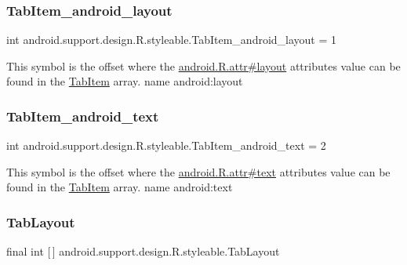 \subsubsection{\texorpdfstring{Tab\+Item\+\_\+android\+\_\+layout}{TabItem\_android\_layout}}
{\footnotesize\ttfamily int android.\+support.\+design.\+R.\+styleable.\+Tab\+Item\+\_\+android\+\_\+layout = 1\hspace{0.3cm}{\ttfamily [static]}}

This symbol is the offset where the \hyperlink{}{android.\+R.\+attr\#layout} attribute\textquotesingle{}s value can be found in the \hyperlink{classandroid_1_1support_1_1design_1_1R_1_1styleable_a244f187ed8d4ed589f36e6db741d19e8}{Tab\+Item} array.  name android\+:layout \mbox{\label{classandroid_1_1support_1_1design_1_1R_1_1styleable_acc3aa4481a2a0607245faab284197fcf}} 
\subsubsection{\texorpdfstring{Tab\+Item\+\_\+android\+\_\+text}{TabItem\_android\_text}}
{\footnotesize\ttfamily int android.\+support.\+design.\+R.\+styleable.\+Tab\+Item\+\_\+android\+\_\+text = 2\hspace{0.3cm}{\ttfamily [static]}}

This symbol is the offset where the \hyperlink{}{android.\+R.\+attr\#text} attribute\textquotesingle{}s value can be found in the \hyperlink{classandroid_1_1support_1_1design_1_1R_1_1styleable_a244f187ed8d4ed589f36e6db741d19e8}{Tab\+Item} array.  name android\+:text \mbox{\label{classandroid_1_1support_1_1design_1_1R_1_1styleable_a514b47b47f600f9421b65f4f0aa832d6}} 
\subsubsection{\texorpdfstring{Tab\+Layout}{TabLayout}}
{\footnotesize\ttfamily final int \mbox{[}$\,$\mbox{]} android.\+support.\+design.\+R.\+styleable.\+Tab\+Layout\hspace{0.3cm}{\ttfamily [static]}}

